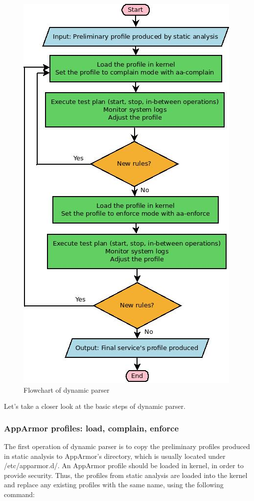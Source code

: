 \begin{figure}[hp!]
  \centering
   \includegraphics[width=0.8\linewidth]{figures/DynamicAlgo.jpeg}
   \caption{Flowchart of dynamic parser}
\end{figure}
Let's take a closer look at the basic steps of dynamic parser.

\subsubsection{AppArmor profiles: load, complain, enforce}
The first operation of dynamic parser is to copy the preliminary profiles produced in static analysis to AppArmor's directory, which is usually located under /etc/apparmor.d/. An AppArmor profile should be loaded in kernel, in order to provide security. Thus, the profiles from static analysis are loaded into the kernel and replace any existing profiles with the same name, using the following command:

